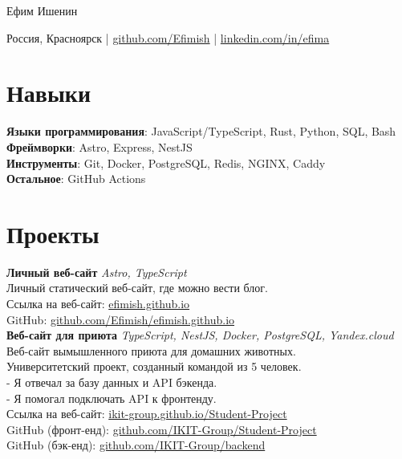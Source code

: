 \documentclass[a4paper, 12pt]{article}
\begin{document}
\centerline{\Huge Ефим Ишенин}
\vspace{10pt}
\centerline{
  Россия, Красноярск |
  \href{https://github.com/Efimish}{github.com/Efimish} |
  \href{https://www.linkedin.com/in/efima}{linkedin.com/in/efima}
}

\section{Навыки}

\textbf{Языки программирования}: JavaScript/TypeScript, Rust, Python, SQL, Bash \\
\textbf{Фреймворки}: Astro, Express, NestJS \\
\textbf{Инструменты}: Git, Docker, PostgreSQL, Redis, NGINX, Caddy \\
\textbf{Остальное}: GitHub Actions

\section{Проекты}

\textbf{Личный веб-сайт} \hfill \textit{Astro, TypeScript} \\
Личный статический веб-сайт, где можно вести блог. \\
Ссылка на веб-сайт: \href{https://efimish.github.io/}{efimish.github.io} \\
GitHub: \href{https://github.com/Efimish/efimish.github.io}{github.com/Efimish/efimish.github.io} \\

\textbf{Веб-сайт для приюта} \hfill \textit{TypeScript, NestJS, Docker, PostgreSQL, Yandex.cloud} \\
Веб-сайт вымышленного приюта для домашних животных. \\
Университетский проект, созданный командой из 5 человек. \\
- Я отвечал за базу данных и API бэкенда. \\
- Я помогал подключать API к фронтенду. \\
Ссылка на веб-сайт: \href{https://ikit-group.github.io/Student-Project/}{ikit-group.github.io/Student-Project} \\
GitHub (фронт-енд): \href{https://github.com/IKIT-Group/Student-Project}{github.com/IKIT-Group/Student-Project} \\
GitHub (бэк-енд): \href{https://github.com/IKIT-Group/backend}{github.com/IKIT-Group/backend} \\
\end{document}

